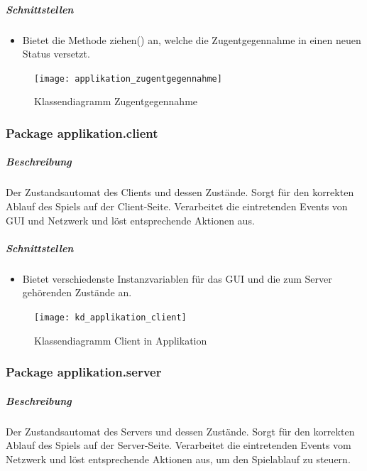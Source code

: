 \documentclass[12pt,halfparskip]{scrartcl}
\begin{document}
\subparagraph{Schnittstellen} %
\label{ssub:schnittstellen}
\begin{itemize}
	\item Bietet die Methode ziehen() an, welche die Zugentgegennahme in einen neuen Status versetzt.
\end{itemize}

\begin{figure}[h]
	\centering
	\texttt{[image: applikation\_zugentgegennahme]}
	\caption{Klassendiagramm Zugentgegennahme}
	\label{fig:applikation_zugentgegennahme}
\end{figure}


\clearpage
\subsubsection{Package applikation.client}
\label{ssub:package_applikation_client} %
\subparagraph{Beschreibung}
\label{ssub:beschreibung}
Der Zustandsautomat des Clients und dessen Zustände. Sorgt für den korrekten Ablauf des Spiels auf der Client-Seite. Verarbeitet die eintretenden Events von GUI und Netzwerk und löst entsprechende Aktionen aus.

\subparagraph{Schnittstellen}
\label{ssub:schnittstellen}
\begin{itemize}
	\item Bietet verschiedenste Instanzvariablen für das GUI und die zum Server gehörenden Zustände an.
\end{itemize}

\begin{figure}[h]
	\centering
	\texttt{[image: kd\_applikation\_client]}
	\caption{Klassendiagramm Client in Applikation}
	\label{fig:kd_applikation_client}
\end{figure}

\clearpage
\subsubsection{Package applikation.server}
\label{ssub:package_applikation_server} %
\subparagraph{Beschreibung}
\label{ssub:beschreibung}
Der Zustandsautomat des Servers und dessen Zustände. Sorgt für den korrekten Ablauf des Spiels auf der Server-Seite. Verarbeitet die eintretenden Events vom Netzwerk und löst entsprechende Aktionen aus, um den Spielablauf zu steuern.
\end{document}
